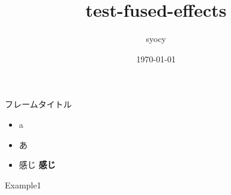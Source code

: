 \documentclass[luatex,unicode]{beamer}
\title{test-fused-effects}
\author{syocy}
\date{\today}
\begin{document}
\begin{frame}
  \titlepage
\end{frame}

\begin{frame}{フレームタイトル}
  \begin{itemize}
  \item a
  \item あ
  \item 感じ \textbf{感じ}
  \end{itemize}
\end{frame}

\begin{frame}{Example1}
  
\end{frame}
\end{document}
